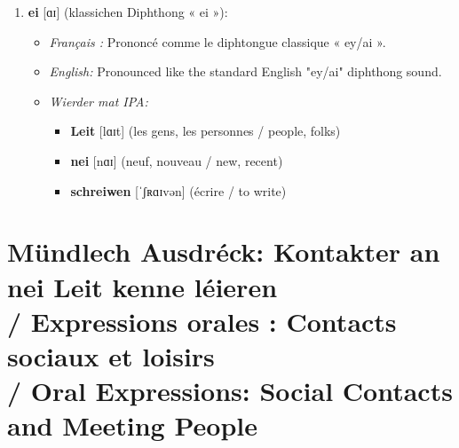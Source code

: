 \begin{enumerate}
    \item \textbf{ei} [ɑɪ] (klassichen Diphthong « ei »):
    \begin{itemize}
        \item \textit{Français :} Prononcé comme le diphtongue classique « ey/ai ».
        \item \textit{English:} Pronounced like the standard English "ey/ai" diphthong sound.
        \item \textit{Wierder mat IPA:}
        \begin{itemize}
            \item \textbf{Leit} [lɑɪt] (les gens, les personnes / people, folks)
            \item \textbf{nei} [nɑɪ] (neuf, nouveau / new, recent)
            \item \textbf{schreiwen} [ˈʃʀɑɪvən] (écrire / to write)
        \end{itemize}
    \end{itemize}
\end{enumerate}

\vspace{1.5em}

\section[Mündlech Ausdréck / Oral Expressions]{Mündlech Ausdréck: Kontakter an nei Leit kenne léieren \\/ Expressions orales : Contacts sociaux et loisirs \\/ Oral Expressions: Social Contacts and Meeting People}

